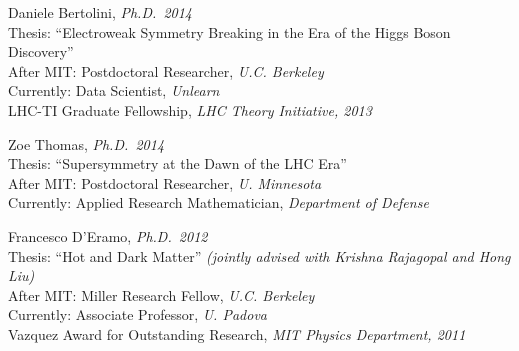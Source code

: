 \item Daniele Bertolini, \emph{Ph.D.~2014}
\\ \sh Thesis: ``Electroweak Symmetry Breaking in the Era of the Higgs Boson Discovery''
\\ \sh After MIT: Postdoctoral Researcher, \emph{U.C. Berkeley}
\\ \sh Currently: Data Scientist, \emph{Unlearn}
\\ \sh LHC-TI Graduate Fellowship, \emph{LHC Theory Initiative, 2013}

\item Zoe Thomas, \emph{Ph.D.~2014}
\\ \sh Thesis: ``Supersymmetry at the Dawn of the LHC Era''
\\ \sh After MIT: Postdoctoral Researcher, \emph{U. Minnesota}
\\ \sh Currently: Applied Research Mathematician, \emph{Department of Defense}

\item Francesco D'Eramo, \emph{Ph.D.~2012}
\\ \sh Thesis: ``Hot and Dark Matter'' \emph{(jointly advised with Krishna Rajagopal and Hong Liu)}
\\ \sh After MIT: Miller Research Fellow, \emph{U.C. Berkeley}
\\ \sh Currently: Associate Professor, \emph{U. Padova}
\\ \sh Vazquez Award for Outstanding Research, \emph{MIT Physics Department, 2011}

\el
